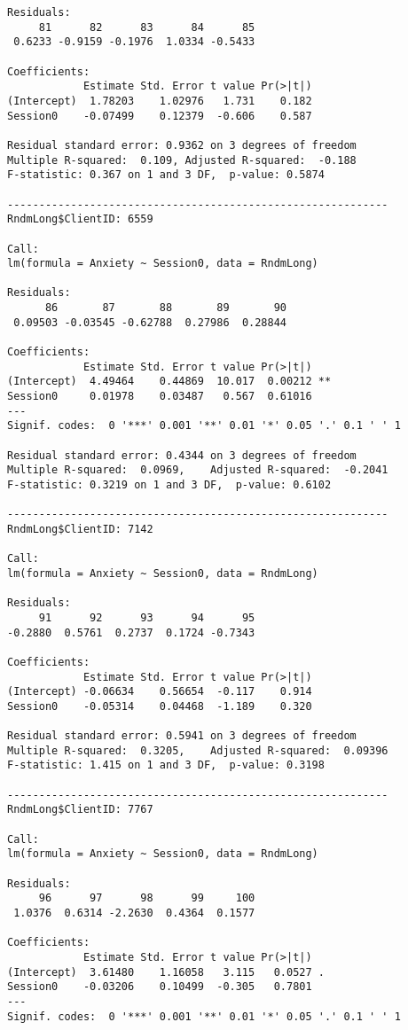 \documentclass[
  11pt,
]{book}
\begin{document}
\begin{verbatim}
Residuals:
     81      82      83      84      85 
 0.6233 -0.9159 -0.1976  1.0334 -0.5433 

Coefficients:
            Estimate Std. Error t value Pr(>|t|)
(Intercept)  1.78203    1.02976   1.731    0.182
Session0    -0.07499    0.12379  -0.606    0.587

Residual standard error: 0.9362 on 3 degrees of freedom
Multiple R-squared:  0.109, Adjusted R-squared:  -0.188 
F-statistic: 0.367 on 1 and 3 DF,  p-value: 0.5874

------------------------------------------------------------ 
RndmLong$ClientID: 6559

Call:
lm(formula = Anxiety ~ Session0, data = RndmLong)

Residuals:
      86       87       88       89       90 
 0.09503 -0.03545 -0.62788  0.27986  0.28844 

Coefficients:
            Estimate Std. Error t value Pr(>|t|)   
(Intercept)  4.49464    0.44869  10.017  0.00212 **
Session0     0.01978    0.03487   0.567  0.61016   
---
Signif. codes:  0 '***' 0.001 '**' 0.01 '*' 0.05 '.' 0.1 ' ' 1

Residual standard error: 0.4344 on 3 degrees of freedom
Multiple R-squared:  0.0969,    Adjusted R-squared:  -0.2041 
F-statistic: 0.3219 on 1 and 3 DF,  p-value: 0.6102

------------------------------------------------------------ 
RndmLong$ClientID: 7142

Call:
lm(formula = Anxiety ~ Session0, data = RndmLong)

Residuals:
     91      92      93      94      95 
-0.2880  0.5761  0.2737  0.1724 -0.7343 

Coefficients:
            Estimate Std. Error t value Pr(>|t|)
(Intercept) -0.06634    0.56654  -0.117    0.914
Session0    -0.05314    0.04468  -1.189    0.320

Residual standard error: 0.5941 on 3 degrees of freedom
Multiple R-squared:  0.3205,    Adjusted R-squared:  0.09396 
F-statistic: 1.415 on 1 and 3 DF,  p-value: 0.3198

------------------------------------------------------------ 
RndmLong$ClientID: 7767

Call:
lm(formula = Anxiety ~ Session0, data = RndmLong)

Residuals:
     96      97      98      99     100 
 1.0376  0.6314 -2.2630  0.4364  0.1577 

Coefficients:
            Estimate Std. Error t value Pr(>|t|)  
(Intercept)  3.61480    1.16058   3.115   0.0527 .
Session0    -0.03206    0.10499  -0.305   0.7801  
---
Signif. codes:  0 '***' 0.001 '**' 0.01 '*' 0.05 '.' 0.1 ' ' 1


\end{verbatim}
\end{document}
